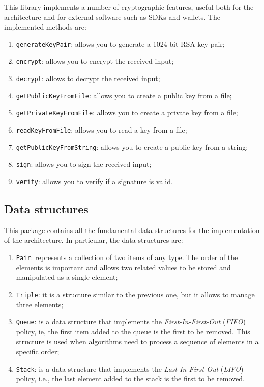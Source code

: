 This library implements a number of cryptographic features, useful both for the architecture and for 
external software such as SDKs and wallets. The implemented methods are:
\begin{enumerate}
   \item \verb|generateKeyPair|: allows you to generate a 1024-bit RSA key pair;
   \item \verb|encrypt|: allows you to encrypt the received input;
   \item \verb|decrypt|: allows to decrypt the received input;
   \item \verb|getPublicKeyFromFile|: allows you to create a public key from a file;
   \item \verb|getPrivateKeyFromFile|: allows you to create a private key from a file;
   \item \verb|readKeyFromFile|: allows you to read a key from a file;
   \item \verb|getPublicKeyFromString|: allows you to create a public key from a string;
   \item \verb|sign|: allows you to sign the received input;
   \item \verb|verify|: allows you to verify if a signature is valid.
\end{enumerate}

\subsection{Data structures}

This package contains all the fundamental data structures for the implementation of the architecture. In 
particular, the data structures are:
\begin{enumerate}
   \item \verb|Pair|: represents a collection of two items of any type. The order of the elements is 
   important and allows two related values to be stored and manipulated as a single element;
   \item \verb|Triple|: it is a structure similar to the previous one, but it allows to manage three 
   elements;
   \item \verb|Queue|: is a data structure that implements the \textit{First-In-First-Out} 
   (\textit{FIFO}) policy, ie, the first item added to the queue is the first to be removed. This 
   structure is used when algorithms need to process a sequence of elements in a specific order;
   \item \verb|Stack|: is a data structure that implements the \textit{Last-In-First-Out} 
   (\textit{LIFO}) policy, i.e., the last element added to the stack is the first to be removed.
\end{enumerate}

